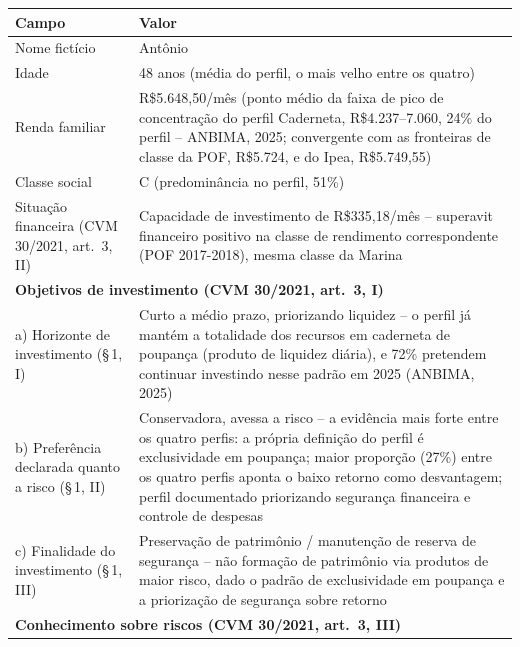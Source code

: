 \begin{quadro}[htbp]
  \centering
  \small
  \caption{Persona 3 -- Perfil Caderneta (20\% da popula\c{c}\~ao)}
  \label{qua:persona-caderneta}
  \begin{tabular}{p{5cm}p{8cm}}
    \toprule
    \textbf{Campo} & \textbf{Valor} \\
    \midrule
    Nome fict\'icio & Ant\^onio \\
    Idade & 48 anos (m\'edia do perfil, o mais velho entre os quatro) \\
    Renda familiar & R\$5.648,50/m\^es (ponto m\'edio da faixa de pico de concentra\c{c}\~ao do perfil Caderneta, R\$4.237--7.060, 24\% do perfil -- ANBIMA, 2025; convergente com as fronteiras de classe da POF, R\$5.724, e do Ipea, R\$5.749,55) \\
    Classe social & C (predomin\^ancia no perfil, 51\%) \\
    Situa\c{c}\~ao financeira (CVM 30/2021, art.\ 3\textordmasculine{}, II) & Capacidade de investimento de R\$335,18/m\^es -- superavit financeiro positivo na classe de rendimento correspondente (POF 2017-2018), mesma classe da Marina \\
    \multicolumn{2}{l}{\textbf{Objetivos de investimento (CVM 30/2021, art.\ 3\textordmasculine{}, I)}} \\
    \quad a) Horizonte de investimento (\S\,1\textordmasculine{}, I) & Curto a m\'edio prazo, priorizando liquidez -- o perfil j\'a mant\'em a totalidade dos recursos em caderneta de poupan\c{c}a (produto de liquidez di\'aria), e 72\% pretendem continuar investindo nesse padr\~ao em 2025 (ANBIMA, 2025) \\
    \quad b) Prefer\^encia declarada quanto a risco (\S\,1\textordmasculine{}, II) & Conservadora, avessa a risco -- a evid\^encia mais forte entre os quatro perfis: a pr\'opria defini\c{c}\~ao do perfil \'e exclusividade em poupan\c{c}a; maior propor\c{c}\~ao (27\%) entre os quatro perfis aponta o baixo retorno como desvantagem; perfil documentado priorizando seguran\c{c}a financeira e controle de despesas \\
    \quad c) Finalidade do investimento (\S\,1\textordmasculine{}, III) & Preserva\c{c}\~ao de patrim\^onio / manuten\c{c}\~ao de reserva de seguran\c{c}a -- n\~ao forma\c{c}\~ao de patrim\^onio via produtos de maior risco, dado o padr\~ao de exclusividade em poupan\c{c}a e a prioriza\c{c}\~ao de seguran\c{c}a sobre retorno \\
    \multicolumn{2}{l}{\textbf{Conhecimento sobre riscos (CVM 30/2021, art.\ 3\textordmasculine{}, III)}} \\

\end{tabular}
\end{quadro}
